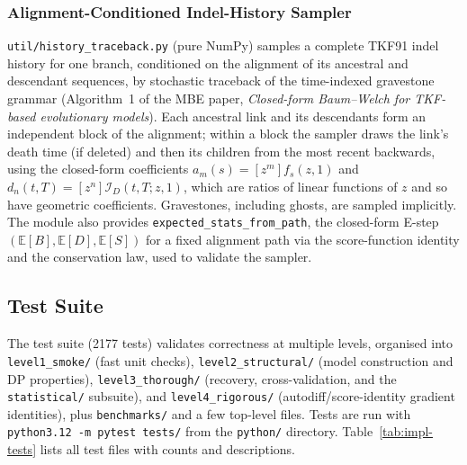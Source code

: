 \subsubsection{Alignment-Conditioned Indel-History Sampler}
\texttt{util/history\_traceback.py} (pure NumPy) samples a complete TKF91
indel history for one branch, conditioned on the alignment of its ancestral
and descendant sequences, by stochastic traceback of the time-indexed
gravestone grammar (Algorithm~1 of the MBE paper,
\emph{Closed-form Baum--Welch for TKF-based evolutionary models}).
Each ancestral link and its descendants form an independent block of the
alignment; within a block the sampler draws the link's death time (if
deleted) and then its children from the most recent backwards, using the
closed-form coefficients $a_m(s)=[z^m]f_s(z,1)$ and
$d_n(t,T)=[z^n]\mathcal I_D(t,T;z,1)$, which are ratios of linear functions
of $z$ and so have geometric coefficients. Gravestones, including ghosts,
are sampled implicitly. The module also provides
\texttt{expected\_stats\_from\_path}, the closed-form E-step
$(\mathbb{E}[B],\mathbb{E}[D],\mathbb{E}[S])$ for a fixed alignment path via the score-function
identity and the conservation law, used to validate the sampler.

\subsection{Test Suite}
\label{sec:impl-tests}

The test suite (2177 tests) validates correctness
at multiple levels, organised into \texttt{level1\_smoke/} (fast unit
checks), \texttt{level2\_structural/} (model construction and DP
properties), \texttt{level3\_thorough/} (recovery, cross-validation,
and the \texttt{statistical/} subsuite), and \texttt{level4\_rigorous/}
(autodiff/score-identity gradient identities), plus \texttt{benchmarks/}
and a few top-level files.
Tests are run with \texttt{python3.12 -m pytest tests/} from the
\texttt{python/} directory.
Table~\ref{tab:impl-tests} lists all test files with counts and descriptions.


